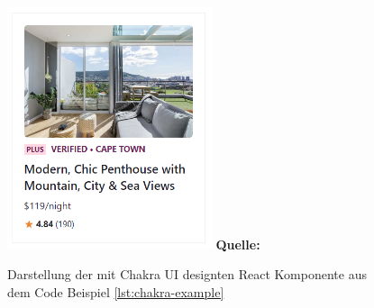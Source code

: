 \documentclass[a4paper,12pt]{report}
\begin{document}
  \begin{figure}[ht]
\raggedleft
  \includegraphics[width=60mm]{Chakra-UI Beispiel.png}
    \footnotesize\sffamily\textbf{Quelle:} \cite{chakraui}
  \caption{Darstellung der mit Chakra UI designten React Komponente aus dem Code Beispiel \ref{lst:chakra-example}}
  \label{fig:chakra-example}
\end{figure}



\end{document}
